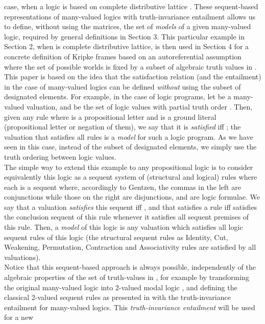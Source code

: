\documentclass[10pt,twocolumn]{article}
\begin{document}
 case, when a  logic is based on complete distributive lattice .
These sequent-based
representations of many-valued logics with truth-invariance
entailment allows us to define, without using the matrices, the set
of \emph{models} of a given many-valued logic, required by  general
definitions in Section 3. This particular example in Section 2, when
 is complete distributive lattice, is then used in Section 4 for
a concrete definition of Kripke frames based on an autoreferential
assumption \cite{Majk06ml} where the set of possible worlds is fixed
by a subset of algebraic truth values in .
\\
This paper is based on the idea that the satisfaction relation (and
the entailment) in the case of many-valued logics can be defined
\emph{without} using the subset of designated elements.
For example, in the case of logic programs,
let  be a many-valued valuation, and  be the set  of logic values with
 partial truth order . Then, given any rule  where  is a propositional
letter and  is a ground literal (propositional letter or
negation of them), we say that it is \emph{satisfied}  iff ; the valuation that
satisfies all rules is a \emph{model} for such a logic program. As
we have seen in this case, instead of the subset  of
designated
elements, we simply use the truth ordering between logic values.\\
  The simple way to extend this example to any
propositional logic  is to consider
equivalently this logic as a sequent system of (structural and
logical) rules  where each  is a
sequent  where,
accordingly to Gentzen, the commas in the left are conjunctions
while those on the right are disjunctions, and  are logic formulae. We say that a valuation  \emph{satisfies} this sequent iff
,
and that  satisfies a rule  iff  satisfies the conclusion
sequent  of this rule whenever it satisfies all sequent premises
 of this rule. Then, a \emph{model} of this logic is
any valuation  which satisfies all
 logic sequent rules of this logic (the structural sequent rules as Identity, Cut, Weakening, Permutation, Contraction and Associativity
 rules are satisfied by all valuations).\\
Notice that this sequent-based approach is always possible,
independently of the algebraic properties of the set of truth-values
in , for example by transforming the original many-valued logic
into 2-valued modal logic \cite{MajkC04,Majk06MV}, and defining the
classical 2-valued sequent rules as presented in \cite{Majk09BS}
with the truth-invariance entailment for many-valued logics. This
\emph{truth-invariance entailment} will be used for a new
\end{document}

